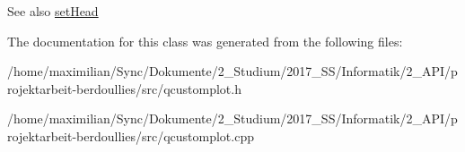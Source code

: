 \begin{DoxySeeAlso}{See also}
\hyperlink{class_q_c_p_item_line_aebf3d687114d584e0459db6759e2c3c3}{set\+Head} 
\end{DoxySeeAlso}


The documentation for this class was generated from the following files\+:\begin{DoxyCompactItemize}
\item 
/home/maximilian/\+Sync/\+Dokumente/2\+\_\+\+Studium/2017\+\_\+\+S\+S/\+Informatik/2\+\_\+\+A\+P\+I/projektarbeit-\/berdoullies/src/qcustomplot.\+h\item 
/home/maximilian/\+Sync/\+Dokumente/2\+\_\+\+Studium/2017\+\_\+\+S\+S/\+Informatik/2\+\_\+\+A\+P\+I/projektarbeit-\/berdoullies/src/qcustomplot.\+cpp\end{DoxyCompactItemize}

